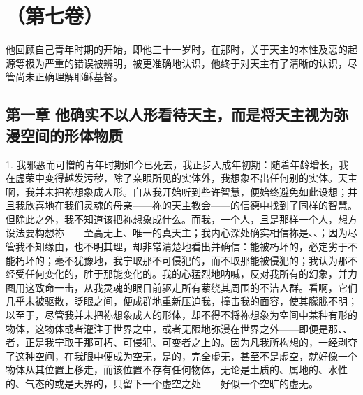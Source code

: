 

\section{（第七卷）}

他回顾自己青年时期的开始，即他三十一岁时，在那时，关于天主的本性及恶的起源等极为严重的错误被辨明，被更准确地认识，他终于对天主有了清晰的认识，尽管尚未正确理解耶稣基督。\par


\subsection{第一章 他确实不以人形看待天主，而是将天主视为弥漫空间的形体物质}

1. 我邪恶而可憎的青年时期如今已死去，我正步入成年初期：随着年龄增长，我在虚荣中变得越发污秽，除了亲眼所见的实体外，我想象不出任何别的实体。天主啊，我并未把祢想象成人形。自从我开始听到些许智慧，便始终避免如此设想；并且我欣喜地在我们灵魂的母亲——祢的天主教会——的信德中找到了同样的智慧。但除此之外，我不知道该把祢想象成什么。而我，一个人，且是那样一个人，想方设法要构想祢——至高无上、唯一的真天主；我内心深处确实相信祢是、、；因为尽管我不知缘由，也不明其理，却非常清楚地看出并确信：能被朽坏的，必定劣于不能朽坏的；毫不犹豫地，我宁取那不可侵犯的，而不取那能被侵犯的；我认为那不经受任何变化的，胜于那能变化的。我的心猛烈地呐喊，反对我所有的幻象，并力图用这致命一击，从我灵魂的眼目前驱走所有萦绕其周围的不洁人群。看啊，它们几乎未被驱散，眨眼之间，便成群地重新压迫我，撞击我的面容，使其朦胧不明；以至于，尽管我并未把祢想象成人的形体，却不得不将祢想象为空间中某种有形的物体，这物体或者灌注于世界之中，或者无限地弥漫在世界之外——即便是那、、者，正是我宁取于那可朽、可侵犯、可变者之上的。因为凡我所构想的，一经剥夺了这种空间，在我眼中便成为空无，是的，完全虚无，甚至不是虚空，就好像一个物体从其位置上移走，而该位置不存有任何物体，无论是土质的、属地的、水性的、气态的或是天界的，只留下一个虚空之处——好似一个空旷的虚无。\par

